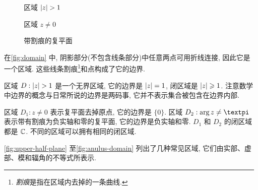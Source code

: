 \begin{figure}[H]
  \centering
  \begin{minipage}{.32\textwidth}
    \centering
    \caption{区域 $\lvert z\rvert>1$\footnotemark}
  \end{minipage}
  \begin{minipage}{.32\textwidth}
    \centering
    \caption{区域 $z\neq0$}
  \end{minipage}
  \begin{minipage}{.32\textwidth}
    \centering
    \caption{带割痕的复平面}
  \end{minipage}
\end{figure}

\begin{exampleenum}
  \item 在\ref{fig:domain} 中, 阴影部分(不包含线条部分)中任意两点可用折线连接, 因此它是一个区域.
  这些线条割痕\footnote{\emph{割痕}是指在区域内去掉的一条曲线.}和点构成了它的边界.
  \item 区域 $D:\lvert z\rvert>1$ 是一个无界区域, 它的边界是 $\lvert z\rvert=1$, 闭区域是 $\lvert z\rvert\geqslant 1$.
  注意数学中边界的概念与日常所说的边界是两码事, 它并不表示集合被包含在边界内部. 
  \item 区域 $D_1:z\neq 0$ 表示复平面去掉原点, 它的边界是 $\{0\}$.
  区域 $D_2: \arg z\neq\cpi$ 表示带有割痕为负实轴和零的复平面, 它的边界是负实轴和零.
  $D_1$ 和 $D_2$ 的闭区域都是 ${\mathbb{C}}$.
  不同的区域可以拥有相同的闭区域.
  \item \ref{fig:upper-half-plane} 至\ref{fig:anulus-domain} 列出了几种常见区域, 它们由实部、虚部、模和辐角的不等式所表示. 
\end{exampleenum}

